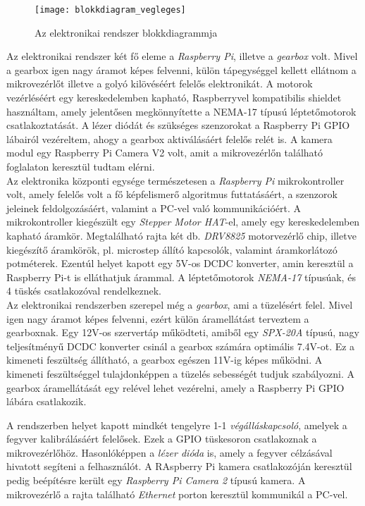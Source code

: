 \begin{figure}[h!]
	\centering
	\texttt{[image: blokkdiagram\_vegleges]}
	\caption{Az elektronikai rendszer blokkdiagrammja}
	\label{fig:system_blokkdiagram}
\end{figure}

Az elektronikai rendszer két fő eleme a \textsl{Raspberry Pi}, illetve a \textsl{gearbox} volt. Mivel a gearbox igen nagy áramot képes felvenni, külön tápegységgel kellett ellátnom a mikrovezérlőt illetve a golyó kilövéséért felelős elektronikát. A motorok vezérléséért egy kereskedelemben kapható, Raspberryvel kompatibilis shieldet használtam, amely jelentősen megkönnyítette a NEMA-17 típusú léptetőmotorok csatlakoztatását. A lézer diódát és szükséges szenzorokat a Raspberry Pi GPIO lábairól vezéreltem, ahogy a gearbox aktiválásáért felelős relét is. A kamera modul egy Raspberry Pi Camera V2 volt, amit a mikrovezérlőn található foglalaton keresztül tudtam elérni.\\ 

Az elektronika központi egysége természetesen a \textsl{Raspberry Pi} mikrokontroller volt, amely felelős volt a fő képfelismerő algoritmus futtatásáért, a szenzorok jeleinek feldolgozásáért, valamint a PC-vel való kommunikációért. A mikrokontroller kiegészült egy \textsl{Stepper Motor HAT}-el, amely egy kereskedelemben kapható áramkör. Megtalálható rajta két db. \textsl{DRV8825} motorvezérlő chip, illetve kiegészítő áramkörök, pl. microstep állító kapcsolók, valamint áramkorlátozó potméterek. Ezentúl helyet kapott egy 5V-os DCDC konverter, amin keresztül a Raspberry Pi-t is elláthatjuk árammal. A léptetőmotorok \textsl{NEMA-17} típusúak, és 4 tüskés csatlakozóval rendelkeznek.\\

Az elektronikai rendszerben szerepel még a \textsl{gearbox}, ami a tüzelésért felel. Mivel igen nagy áramot képes felvenni, ezért külön áramellátást terveztem a gearboxnak. Egy 12V-os szervertáp működteti, amiből egy \textsl{SPX-20A} típusú, nagy teljesítményű DCDC konverter csinál a gearbox számára optimális 7.4V-ot. Ez a kimeneti feszültség állítható, a gearbox egészen 11V-ig képes működni. A kimeneti feszültséggel tulajdonképpen a tüzelés sebességét tudjuk szabályozni. A gearbox áramellátását egy relével lehet vezérelni, amely a Raspberry Pi GPIO lábára csatlakozik.

\pagebreak

A rendszerben helyet kapott mindkét tengelyre 1-1 \textsl{végálláskapcsoló}, amelyek a fegyver kalibrálásáért felelősek. Ezek a GPIO tüskesoron csatlakoznak a mikrovezérlőhöz. Hasonlóképpen a \textsl{lézer dióda} is, amely a fegyver célzásával hivatott segíteni a felhasználót. A RAspberry Pi kamera csatlakozóján keresztül pedig beépítésre került egy \textsl{Raspberry Pi Camera 2} típusú kamera. A mikrovezérlő a rajta található \textsl{Ethernet} porton keresztül kommunikál a PC-vel.

